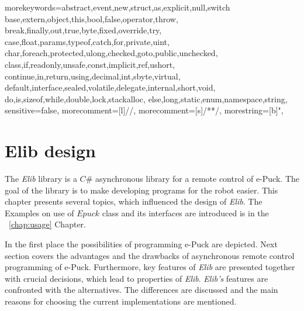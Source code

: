   {morekeywords={abstract,event,new,struct,as,explicit,null,switch
		base,extern,object,this,bool,false,operator,throw,
		break,finally,out,true,byte,fixed,override,try,
		case,float,params,typeof,catch,for,private,uint,
		char,foreach,protected,ulong,checked,goto,public,unchecked,
		class,if,readonly,unsafe,const,implicit,ref,ushort,
		continue,in,return,using,decimal,int,sbyte,virtual,
		default,interface,sealed,volatile,delegate,internal,short,void,
		do,is,sizeof,while,double,lock,stackalloc,
		else,long,static,enum,namespace,string},
	  sensitive=false,
	  morecomment=[l]{//},
	  morecomment=[s]{/*}{*/},
	  morestring=[b]",
}


\chapter{Elib design} \label{chap:elib}
	The {\it Elib} library is a $C\#$ asynchronous library for a remote control of e-Puck. 
	The goal of the library is to make developing programs for the robot easier.
	This chapter presents several topics, which influenced the design of {\it Elib}.
	The Examples on use of $Epuck$ class and its interfaces are introduced is in the ~\ref{chap:usage} Chapter.

	In the first place the possibilities of programming e-Puck are depicted.
	Next section covers the advantages and the drawbacks of asynchronous remote control programming of e-Puck.
	Furthermore, key features of {\it Elib} are presented together with crucial decisions, which
	lead to properties of {\it Elib}. 
	{\it Elib's} features are confronted with the alternatives. The differences are discussed
	and the main reasons for choosing the current implementations are mentioned.

